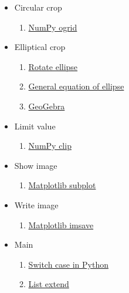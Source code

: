 \documentclass{article}
\begin{document}
\begin{itemize}
\begin{enumerate}
  \end{enumerate}
  \item Circular crop
  \begin{enumerate}
    \item \href{https://numpy.org/doc/stable/reference/generated/numpy.ogrid.html}{NumPy ogrid}
  \end{enumerate}
  \item Elliptical crop
  \begin{enumerate}
    \item \href{https://math.stackexchange.com/questions/426150/what-is-the-general-equation-of-the-ellipse-that-is-not-in-the-origin-and-rotate}{Rotate ellipse}
    \item \href{https://www.maa.org/external_archive/joma/Volume8/Kalman/General.html}{General equation of ellipse}
    \item \href{https://geogebra.org/graphing}{GeoGebra}
  \end{enumerate}
  \item Limit value
  \begin{enumerate}
    \item \href{https://numpy.org/doc/stable/reference/generated/numpy.clip.html}{NumPy clip}
  \end{enumerate}
  \item Show image
  \begin{enumerate}
    \item \href{https://matplotlib.org/stable/api/_as_gen/matplotlib.pyplot.subplot.html}{Matplotlib subplot}
  \end{enumerate}
  \item Write image
  \begin{enumerate}
    \item \href{https://matplotlib.org/stable/api/_as_gen/matplotlib.pyplot.imsave.html}{Matplotlib imsave}
  \end{enumerate}
  \item Main
  \begin{enumerate}
    \item \href{https://www.freecodecamp.org/news/python-switch-statement-switch-case-example/}{Switch case in Python}
    \item \href{https://www.w3schools.com/python/ref_list_extend.asp}{List extend}
  \end{enumerate}
\end{itemize}
 
\end{document}
